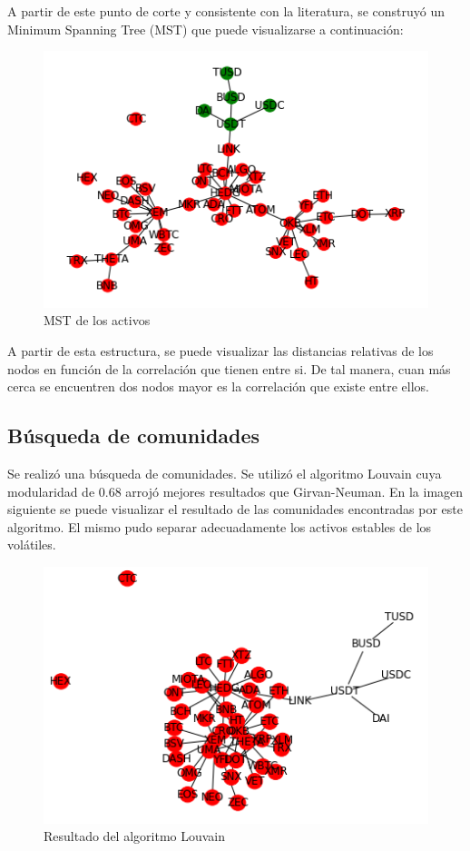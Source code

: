 \documentclass[runningheads,a4paper,10pt]{etc/llncs}
\begin{document}
A partir de este punto de corte y consistente con la literatura, se construyó un Minimum Spanning Tree (MST) que puede visualizarse a continuación:

\begin{figure}[htp]
    \centering
    \includegraphics[scale=1]{images/mst.png}
    \caption{MST de los activos}
    \label{fig:hist_corr}
\end{figure}

A partir de esta estructura, se puede visualizar las distancias relativas de los nodos en función de la correlación que tienen entre si. De tal manera, cuan más cerca se encuentren dos nodos mayor es la correlación que existe entre ellos. 

\subsection{Búsqueda de comunidades}

Se realizó una búsqueda de comunidades. Se utilizó el algoritmo Louvain cuya modularidad de 0.68 arrojó mejores resultados que Girvan-Neuman. En la imagen siguiente se puede visualizar el resultado de las comunidades encontradas por este algoritmo. El mismo pudo separar adecuadamente los activos estables de los volátiles.


\begin{figure}[htp]
    \centering
    \includegraphics[scale=1]{images/community_louvain.png}
    \caption{Resultado del algoritmo Louvain}
    \label{fig:hist_corr}
\end{figure}
\end{document}
